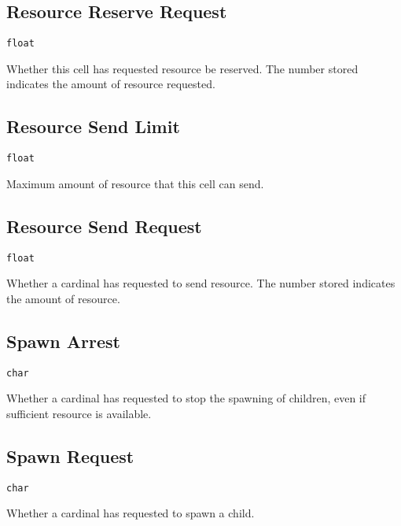 \subsection{Resource Reserve Request}

\texttt{float}

Whether this cell has requested resource be reserved. The number stored indicates the amount of resource requested.

\subsection{Resource Send Limit}

\texttt{float}

Maximum amount of resource that this cell can send.

\subsection{Resource Send Request}

\texttt{float}

Whether a cardinal has requested to send resource. The number stored indicates the amount of resource.

\subsection{Spawn Arrest}

\texttt{char}

Whether a cardinal has requested to stop the spawning of children, even if sufficient resource is available.

\subsection{Spawn Request}

\texttt{char}

Whether a cardinal has requested to spawn a child.
